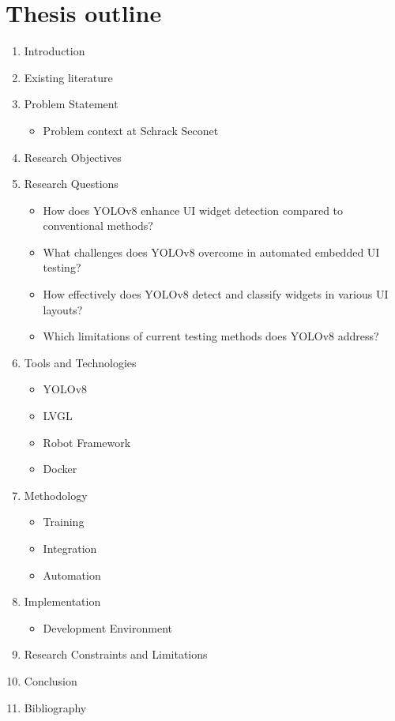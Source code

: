 \documentclass[Proposal,BIC,english,IEEE]{BASE/twbook} %
\begin{document}
\chapter{Thesis outline}
\begin{enumerate}
    \item Introduction
    \item Existing literature
    \item Problem Statement
          \begin{itemize}
              \item Problem context at Schrack Seconet
          \end{itemize}
    \item Research Objectives
    \item Research Questions
          \begin{itemize}
              \item How does YOLOv8 enhance UI widget detection compared to conventional methods?
              \item What challenges does YOLOv8 overcome in automated embedded UI testing?
              \item How effectively does YOLOv8 detect and classify widgets in various UI layouts?
              \item Which limitations of current testing methods does YOLOv8 address?
          \end{itemize}
    \item Tools and Technologies
          \begin{itemize}
              \item YOLOv8
              \item LVGL
              \item Robot Framework
              \item Docker
          \end{itemize}
    \item Methodology
          \begin{itemize}
              \item Training
              \item Integration
              \item Automation
          \end{itemize}
    \item Implementation
          \begin{itemize}
              \item Development Environment
          \end{itemize}
    \item Research Constraints and Limitations
    \item Conclusion
    \item Bibliography
\end{enumerate}
\newpage
\end{document}
